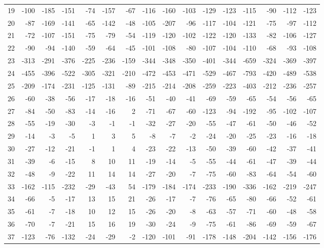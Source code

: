 \begin{longtable}{lrrrrrrrrrrrrrrr}
19 & -100 & -185 & -151 & -74 & -157 & -67 & -116 & -160 & -103 & -129 & -123 & -115 & -90 & -112 & -123 \\
20 & -87 & -169 & -141 & -65 & -142 & -48 & -105 & -207 & -96 & -117 & -104 & -121 & -75 & -97 & -112 \\
21 & -72 & -107 & -151 & -75 & -79 & -54 & -119 & -120 & -102 & -122 & -120 & -133 & -82 & -106 & -127 \\
22 & -90 & -94 & -140 & -59 & -64 & -45 & -101 & -108 & -80 & -107 & -104 & -110 & -68 & -93 & -108 \\
23 & -313 & -291 & -376 & -225 & -236 & -159 & -344 & -348 & -350 & -401 & -344 & -659 & -324 & -369 & -397 \\
24 & -455 & -396 & -522 & -305 & -321 & -210 & -472 & -453 & -471 & -529 & -467 & -793 & -420 & -489 & -538 \\
25 & -209 & -174 & -231 & -125 & -131 & -89 & -215 & -214 & -208 & -259 & -223 & -403 & -212 & -236 & -257 \\
26 & -60 & -38 & -56 & -17 & -18 & -16 & -51 & -40 & -41 & -69 & -59 & -65 & -54 & -56 & -65 \\
27 & -84 & -50 & -83 & -14 & -16 & 2 & -71 & -67 & -60 & -123 & -94 & -192 & -95 & -102 & -107 \\
28 & -55 & -19 & -30 & -3 & -1 & -1 & -32 & -27 & -20 & -55 & -47 & -61 & -50 & -46 & -52 \\
29 & -14 & -3 & -5 & 1 & 3 & 5 & -8 & -7 & -2 & -24 & -20 & -25 & -23 & -16 & -18 \\
30 & -27 & -12 & -21 & -1 & 1 & 4 & -23 & -22 & -13 & -50 & -39 & -60 & -42 & -37 & -41 \\
31 & -39 & -6 & -15 & 8 & 10 & 11 & -19 & -14 & -5 & -55 & -44 & -61 & -47 & -39 & -44 \\
32 & -48 & -9 & -22 & 11 & 14 & 14 & -27 & -20 & -7 & -75 & -60 & -83 & -64 & -54 & -60 \\
33 & -162 & -115 & -232 & -29 & -43 & 54 & -179 & -184 & -174 & -233 & -190 & -336 & -162 & -219 & -247 \\
34 & -66 & -5 & -17 & 13 & 15 & 21 & -26 & -17 & -7 & -76 & -65 & -80 & -66 & -52 & -61 \\
35 & -61 & -7 & -18 & 10 & 12 & 15 & -26 & -20 & -8 & -63 & -57 & -71 & -60 & -48 & -58 \\
36 & -70 & -7 & -21 & 15 & 16 & 19 & -30 & -24 & -9 & -75 & -61 & -86 & -69 & -59 & -67 \\
37 & -123 & -76 & -132 & -24 & -29 & -2 & -120 & -101 & -91 & -178 & -148 & -204 & -142 & -156 & -176 \\

\end{longtable}
